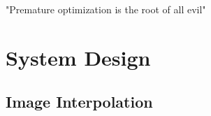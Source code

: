 \begin{savequote}[75mm] 
"Premature optimization is the root of all evil"
\end{savequote}

\chapter{System Design}










\section{Image Interpolation}